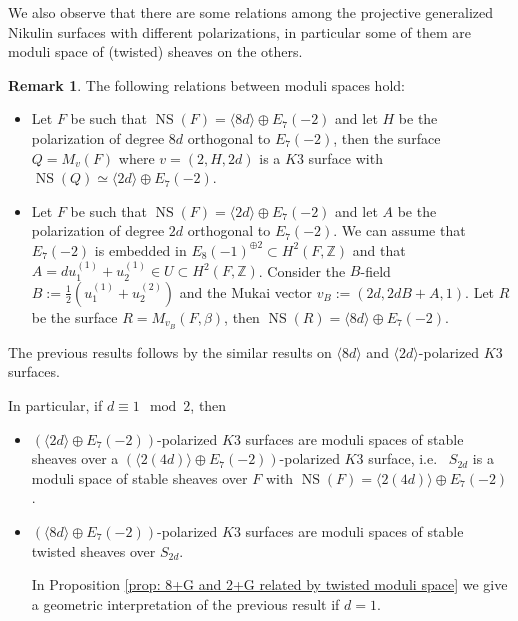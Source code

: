 \documentclass{amsart}
\theoremstyle{definition}
\newtheorem{remark}[thm]{Remark}
\numberwithin{equation}{section}
\numberwithin{equation}{section} \theoremstyle{definition}
\DeclareMathOperator{\NS}{NS}
\newcommand\Z{\mathbb{Z}}
\begin{document}
We also observe that there are some relations among the projective generalized Nikulin surfaces with different polarizations, in particular some of them are moduli space of (twisted) sheaves on the others. 
\begin{remark}
The following relations between moduli spaces hold:
\begin{itemize}
\item Let $F$ be such that $\NS(F)=\langle 8d\rangle\oplus E_7(-2)$ and let $H$ be the polarization of degree $8d$ orthogonal to $E_7(-2)$, then the surface $Q=M_v(F)$ where $v=(2,H,2d)$ is a $K3$ surface with $\NS(Q)\simeq \langle 2d\rangle\oplus E_7(-2)$.
\item Let $F$ be such that $\NS(F)=\langle 2d\rangle\oplus E_7(-2)$ and let $A$ be the polarization of degree $2d$ orthogonal to $E_7(-2)$. We can assume that $E_7(-2)$ is embedded in $E_8(-1)^{\oplus 2}\subset H^2(F,\Z)$ and  that $A=du_1^{(1)}+u_2^{(1)}\in U\subset H^2(F,\Z)$. Consider the $B$-field $B:=\frac{1}{2}(u_1^{(1)}+u_2^{(2)})$ 
and the Mukai vector $v_B:=(2d,2dB+A,1)$. Let $R$ be  the surface $R=M_{v_B}(F,\beta)$, then $\NS(R)=\langle 8d\rangle \oplus E_7(-2)$.
\end{itemize}
The previous results follows by the similar results on $\langle 8d\rangle$ and $\langle 2d\rangle$-polarized $K3$ surfaces.

In particular, if $d\equiv 1\mod 2$, then \begin{itemize}\item$(\langle 2d\rangle\oplus E_7(-2))$-polarized $K3$ surfaces are moduli spaces of stable sheaves over a $(\langle 2(4d)\rangle\oplus E_7(-2))$-polarized $K3$ surface, i.e.~  $S_{2d}$ is a moduli space of stable sheaves over $F$ with $\NS(F)=\langle 2(4d)\rangle\oplus E_7(-2)$.

\item $(\langle 8d\rangle\oplus E_7(-2))$-polarized $K3$ surfaces are  moduli spaces of stable twisted sheaves over $S_{2d}$.

In Proposition \ref{prop: 8+G and 2+G related by twisted moduli space} we give a geometric interpretation of the previous %
result if $d=1$.
\end{itemize}
\end{remark}
\end{document}
